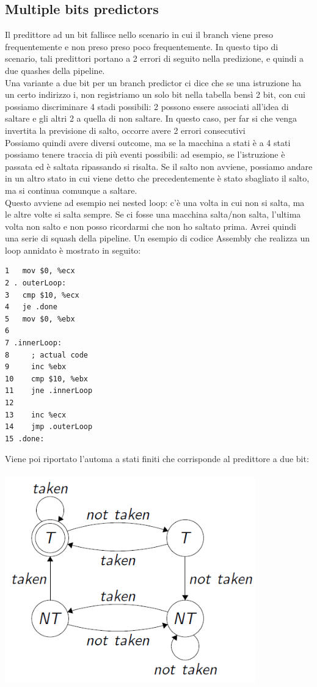 \documentclass[14pt, oneside]{book}
\begin{document}
\subsection{Multiple bits predictors}
Il predittore ad un bit fallisce nello scenario in cui il branch viene preso frequentemente e non preso preso poco frequentemente. In questo tipo di scenario, tali predittori portano a 2 errori di seguito nella predizione, e quindi a due quashes della pipeline.\\ 
Una variante a due bit per un branch predictor ci dice che se una istruzione ha un certo indirizzo i, non registriamo un solo bit nella tabella bensì 2 bit, con cui possiamo discriminare 4 stadi possibili: 2 possono essere associati all'idea di saltare e gli altri 2 a quella di non saltare. In questo caso, per far si che venga invertita la previsione di salto, occorre avere 2 errori consecutivi\\ Possiamo quindi avere diversi outcome, ma se la macchina a stati è a 4 stati possiamo tenere traccia di più eventi possibili: ad esempio, se l'istruzione è passata ed è saltata ripassando si risalta. Se il salto non avviene, possiamo andare in un altro stato in cui viene detto che precedentemente è stato sbagliato il salto, ma si continua comunque a saltare.\\ Questo avviene ad esempio nei nested loop: c'è una volta in cui non si salta, ma le altre volte si salta sempre. Se ci fosse una macchina salta/non salta, l'ultima volta non salto e non posso ricordarmi che non ho saltato prima. Avrei quindi una serie di squash della pipeline. Un esempio di codice Assembly che realizza un loop annidato è mostrato in seguito:
\begin{lstlisting}
1	mov $0, %ecx
2 . outerLoop:
3	cmp $10, %ecx
4	je .done
5	mov $0, %ebx
6	
7 .innerLoop:
8	  ; actual code	
9	  inc %ebx
10	  cmp $10, %ebx
11	  jne .innerLoop
12
13	  inc %ecx
14	  jmp .outerLoop
15 .done:
\end{lstlisting}
Viene poi riportato l'automa a stati finiti che corrisponde al predittore a due bit:\\\\
\includegraphics[scale=0.6]{immagini/2bit_pred}\\\\
\end{document}

